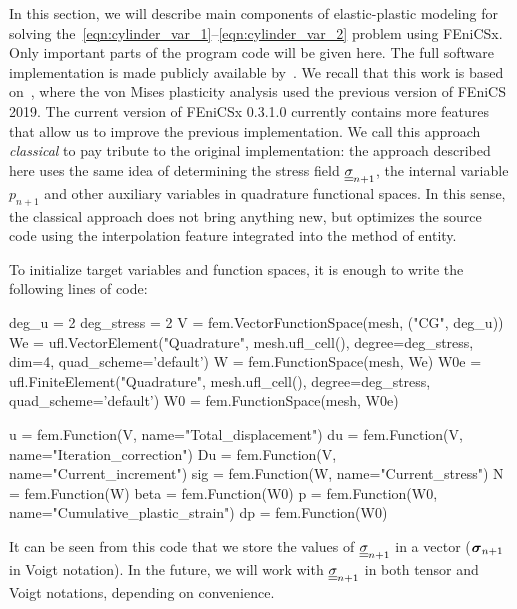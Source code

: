 \documentclass[12pt]{article}
\begin{document}
In this section, we will describe main components of elastic-plastic modeling for solving the~\ref{eqn:cylinder_var_1}--\ref{eqn:cylinder_var_2} problem using FEniCSx. Only important parts of the program code will be given here. The full software implementation is made publicly available by~\parencite{convex-plasticity}. We recall that this work is based on~\parencite{bleyer2018numericaltours}, where the von Mises plasticity analysis used the previous version of FEniCS 2019. The current version of FEniCSx 0.3.1.0 currently contains more features that allow us to improve the previous implementation. We call this approach \textit{classical} to pay tribute to the original implementation: the approach described here uses the same idea of determining the stress field $\underline{\underline{\sigma}}_{n+1}$, the internal variable $p_{n+1}$ and other auxiliary variables in quadrature functional spaces. In this sense, the classical approach does not bring anything new, but optimizes the source code using the interpolation feature integrated into the  method of  entity.

To initialize target variables and function spaces, it is enough to write the following lines of code:

\begin{pythoncode}
    deg_u = 2
    deg_stress = 2
    V = fem.VectorFunctionSpace(mesh, ("CG", deg_u))
    We = ufl.VectorElement("Quadrature", mesh.ufl_cell(), degree=deg_stress, dim=4, quad_scheme='default')
    W = fem.FunctionSpace(mesh, We)
    W0e = ufl.FiniteElement("Quadrature", mesh.ufl_cell(), degree=deg_stress, quad_scheme='default')
    W0 = fem.FunctionSpace(mesh, W0e)

    u = fem.Function(V, name="Total_displacement")
    du = fem.Function(V, name="Iteration_correction")
    Du = fem.Function(V, name="Current_increment")
    sig = fem.Function(W, name="Current_stress")
    N = fem.Function(W)
    beta = fem.Function(W0)
    p = fem.Function(W0, name="Cumulative_plastic_strain")
    dp = fem.Function(W0)
\end{pythoncode}

It can be seen from this code that we store the values of $\underline{\underline{\sigma}}_{n+1}$ in a vector  ($\mbox{\boldmath$\sigma$}_{n+1}$ in Voigt notation). In the future, we will work with $\underline{\underline{\sigma}}_{n+1}$ in both tensor and Voigt notations, depending on convenience.
\end{document}
